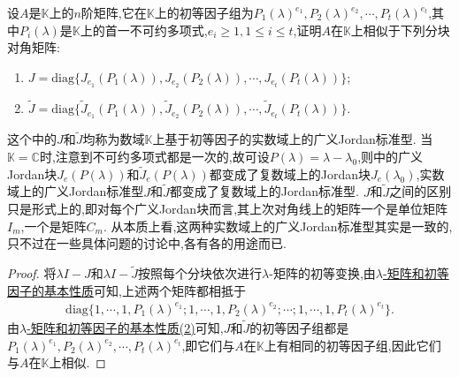 \documentclass[../../main.tex]{subfiles}
\begin{document}
\begin{proposition}\label{proposition:广义标准型理论相关结论1}
设$A$是$\mathbb{K}$上的$n$阶矩阵,它在$\mathbb{K}$上的初等因子组为$P_1(\lambda)^{e_1},P_2(\lambda)^{e_2},\cdots,P_t(\lambda)^{e_t}$,其中$P_i(\lambda)$是$\mathbb{K}$上的首一不可约多项式,$e_i\geqslant 1, 1\leqslant i\leqslant t$,证明$A$在$\mathbb{K}$上相似于下列分块对角矩阵:
\begin{enumerate}[(1)]
\item $J = \mathrm{diag}\{J_{e_1}(P_1(\lambda)),J_{e_2}(P_2(\lambda)),\cdots,J_{e_t}(P_t(\lambda))\};$

\item $\widetilde{J} = \mathrm{diag}\{\widetilde{J}_{e_1}(P_1(\lambda)),\widetilde{J}_{e_2}(P_2(\lambda)),\cdots,\widetilde{J}_{e_t}(P_t(\lambda))\}.$
\end{enumerate}
\end{proposition}
\begin{remark}
这个中的$J$和$\widetilde{J}$均称为数域$\mathbb{K}$上基于初等因子的实数域上的广义Jordan标准型. 当$\mathbb{K}=\mathbb{C}$时,注意到不可约多项式都是一次的,故可设$P(\lambda)=\lambda - \lambda_0$,则中的广义Jordan块$J_e(P(\lambda))$和$\widetilde{J}_e(P(\lambda))$都变成了复数域上的Jordan块$J_e(\lambda_0)$,实数域上的广义Jordan标准型$J$和$\widetilde{J}$都变成了复数域上的Jordan标准型. $J$和$\widetilde{J}$之间的区别只是形式上的,即对每个广义Jordan块而言,其上次对角线上的矩阵一个是单位矩阵$I_m$,一个是矩阵$C_m$. 从本质上看,这两种实数域上的广义Jordan标准型其实是一致的,只不过在一些具体问题的讨论中,各有各的用途而已. 
\end{remark}
\begin{proof}
将$\lambda I - J$和$\lambda I - \widetilde{J}$按照每个分块依次进行$\lambda$-矩阵的初等变换,由\hyperref[theorem:lambda-矩阵和初等因子的基本性质]{$\lambda$-矩阵和初等因子的基本性质}可知,上述两个矩阵都相抵于
\begin{align*}
\mathrm{diag}\{1,\cdots,1,P_1(\lambda)^{e_1};1,\cdots,1,P_2(\lambda)^{e_2};\cdots;1,\cdots,1,P_t(\lambda)^{e_t}\}.
\end{align*}
由\hyperref[theorem:lambda-矩阵和初等因子的基本性质]{$\lambda$-矩阵和初等因子的基本性质(2)}可知,$J$和$\widetilde{J}$的初等因子组都是$P_1(\lambda)^{e_1},P_2(\lambda)^{e_2},\cdots,P_t(\lambda)^{e_t}$,即它们与$A$在$\mathbb{K}$上有相同的初等因子组,因此它们与$A$在$\mathbb{K}$上相似. 

\end{proof}
\end{document}
